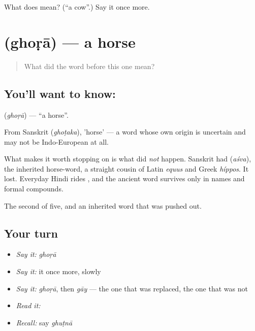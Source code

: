 \begin{tcolorbox}[breakable,colback=teal!4,colframe=teal!35!black,title={Before you move on}]
What does  mean? (\textquotedblleft{}a cow\textquotedblright{}.) Say it once more.
\end{tcolorbox}
\section[\texorpdfstring{\hi{घोड़ा} (ghoṛā)}{घोड़ा (ghoṛā)}]{ (ghoṛā) — a horse}

\label{lesson:HI-C54-horse}



\begin{quote}
What did the word before this one mean?
\end{quote}

\subsection*{You'll want to know: }
\textbf{} (\emph{ghoṛā}) — \textquotedblleft{}a horse\textquotedblright{}.

From Sanskrit  (\emph{ghoṭaka}), 'horse' — a word whose own origin is uncertain and may not be Indo-European at all.

What makes it worth stopping on is what did \emph{not} happen. Sanskrit had  (\emph{aśva}), the inherited horse-word, a straight cousin of Latin \emph{equus} and Greek \emph{híppos}. It lost. Everyday Hindi rides , and the ancient word survives only in names and formal compounds.

\begin{grammarlens}[title={What you've built}]
The second of five, and an inherited word that was pushed out.
\end{grammarlens}

\subsection*{Your turn}
\begin{itemize}
\raggedright
  \item \emph{Say it:} \emph{ghoṛā}
  \item \emph{Say it:} it once more, slowly
  \item \emph{Say it:} \emph{ghoṛā}, then \emph{gāy} — the one that was replaced, the one that was not
  \item \emph{Read it:} \textbf{}
  \item \emph{Recall:} say \emph{ghuṭnā}
\end{itemize}

